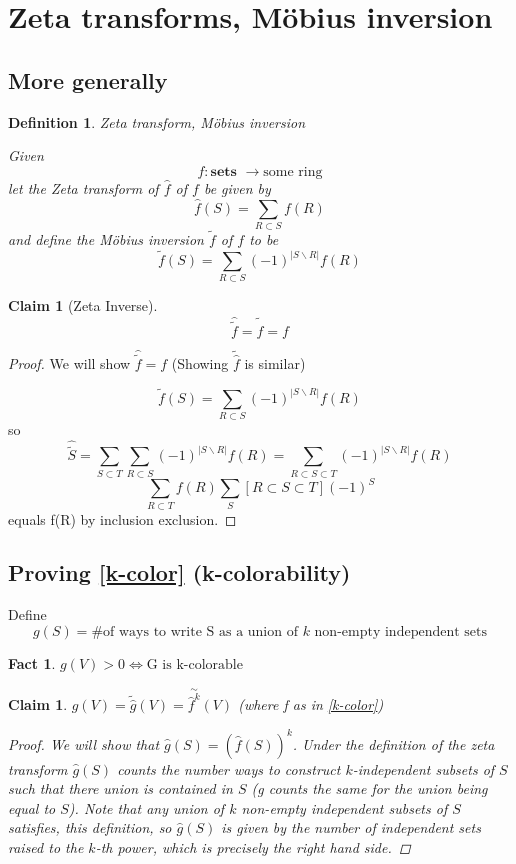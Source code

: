 \documentclass[11pt]{article}
\newtheorem{definition}[theorem]{Definition}
\newtheorem{claim}[theorem]{Claim}
\newtheorem{fact}[theorem]{Fact}
\newcommand{\sets}{\textbf{sets }}
\begin{document}
\section{Zeta transforms, M\"obius inversion}

\subsection{More generally}

\begin{definition}{Zeta transform, M\"obius inversion}

Given 
\[f: \sets \to \text{some ring}\]
let the \textit{Zeta transform} of $\hat{f}$ of $f$ be given by
\[ \hat{f}(S) = \sum_{R \subset S} f(R) \]
and define the M\"obius inversion $\tilde{f}$ of $f$ to be
\[ \tilde{f}(S) = \sum_{R \subset S} (-1)^{|S \backslash R|} f(R) \]

\end{definition}

\begin{claim}[Zeta Inverse]
\label{zetam}
\[
\hat{\tilde{f}} = \tilde{\hat{f}} = f
\]
\end{claim}
\begin{proof}
We will show $\hat{\tilde{f}} = f$ (Showing $\tilde{\hat{f}}$ is similar)

\[ \tilde{f}(S) = \sum_{R\subset S} (-1)^{|S\backslash R|} f(R) \]
so
\[
\hat{\tilde{S}} = \sum_{S \subset T} \sum_{R \subset S} (-1)^{|S \backslash R|} f(R)
= \sum_{R \subset S \subset T} (-1)^{|S \backslash R|} f(R)
\]\[
\sum_{R \subset T} f(R) \sum_S [ R \subset S \subset T ] (-1)^{S}
\]
equals f(R) by inclusion exclusion.
\end{proof}

\subsection{Proving \autoref{k-color} (k-colorability)}

Define 
\[
g(S) = \text{\# of ways to write S as a union of $k$ non-empty independent sets}
\]
\begin{fact}
$g(V) > 0 \iff \text{G is k-colorable}$
\end{fact}

\begin{claim}
$g(V) = \tilde{\hat{g}}(V) = \overset{\sim}{\hat{f}^k}(V)$ (where f as in \autoref{k-color})
\begin{proof}

We will show that $\hat{g}(S) = (\hat{f}(S))^k$.
Under the definition of the zeta transform $\hat{g}(S)$ counts the number ways to construct $k$-independent subsets of $S$ such that there union is contained in $S$ (g counts the same for the union being equal to $S$).
Note that any union of $k$ non-empty independent subsets of $S$ satisfies, this definition, so $\hat{g}(S)$ is given by the number of independent sets raised to the $k$-th power, which is precisely the right hand side.

\end{proof}
\end{claim}
\end{document}
